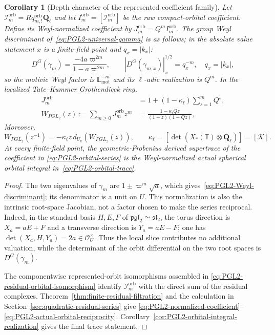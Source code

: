 \documentclass[11pt]{article}
\newtheorem{corollary}[theorem]{Corollary}
\theoremstyle{definition}
\theoremstyle{remark}
\newcommand{\Qell}{\mathbf Q_\ell}
\newcommand{\Lmot}{\mathbb L_{\mathrm{mot}}}
\newcommand{\Uk}{U_k}
\newcommand{\kappaell}{\kappa_{\ell}}
\newcommand{\cK}{\mathcal K}
\begin{document}
\begin{corollary}[Depth character of the represented coefficient family]
\label{thm:PGL2-orbital-reciprocity}
Let
$\mathcal I_m^{\mathrm{orb}}=Rq^{\mathrm{orb}}_{m,!}\Qell$ and let
$I_m^{\mathrm{orb}}=[\mathcal I_m^{\mathrm{orb}}]$ be the raw compact-orbital
coefficient.  Define its Weyl-normalized coefficient by
$J_m^{\mathrm{orb}}=Q^mI_m^{\mathrm{orb}}$.  The group Weyl
discriminant of~\eqref{eq:PGL2-universal-gamma} is as follows; in the absolute
value statement $x$ is a finite-field point and $q_x=|k_x|$:
\begin{equation}
 D^G(\gamma_m)
 =\frac{-4a\varpi^{2m}}{1-a\varpi^{2m}},
 \qquad |D^G(\gamma_{m,x})|_x^{1/2}=q_x^{-m},
 \quad q_x=|k_x|,
 \label{eq:PGL2-Weyl-discriminant}
\end{equation}
so the motivic Weyl factor is $\Lmot^{-m}$ and its $\ell$-adic realization is
$Q^m$.  In the localized
Tate--Kummer Grothendieck ring,
\begin{align}
 J_m^{\mathrm{orb}}
 &=1+(1-\kappaell)\sum_{s=1}^mQ^s,
 \label{eq:PGL2-normalized-coefficient}\\
 W_{PGL_2}(z)
 :=\sum_{m\ge0}J_m^{\mathrm{orb}}z^m
 &=\frac{1-\kappaell Qz}{(1-z)(1-Qz)},
 \label{eq:PGL2-orbital-series}
\end{align}
Moreover,
\begin{equation}
 \boxed{W_{PGL_2}(z^{-1})
 =-\kappaell z\,d_{\Uk}(W_{PGL_2}(z)),\qquad
 \kappaell=[\det(X_*(\mathbb T)\otimes\Qell)]=[\cK].}
 \label{eq:PGL2-actual-orbital-reciprocity}
\end{equation}
At every finite-field point, the geometric-Frobenius derived supertrace of the coefficient in
\eqref{eq:PGL2-orbital-series} is the Weyl-normalized actual spherical orbital
integral in~\eqref{eq:PGL2-orbital-trace}.
\end{corollary}

\begin{proof}
The two eigenvalues of $\gamma_m$ are
$1\pm\varpi^m\sqrt a$, which gives~\eqref{eq:PGL2-Weyl-discriminant}; its
denominator is a unit on $U$.  This normalization is also the intrinsic
root-space Jacobian, not a factor chosen to make the series reciprocal.
Indeed, in the standard basis $H,E,F$ of
$\mathfrak{pgl}_2\simeq\mathfrak{sl}_2$, the torus direction is
$X_a=aE+F$ and a transverse direction is $Y_a=aE-F$; one has
$\det(X_a,H,Y_a)=2a\in\mathcal O_U^\times$.  Thus the local slice contributes
no additional valuation, while the determinant of the orbit differential on
the two root spaces is $D^G(\gamma_m)$.

The componentwise represented-orbit
isomorphisms assembled in
\eqref{eq:PGL2-residual-orbital-isomorphism} identify
$\mathcal I_m^{\mathrm{orb}}$ with the direct sum of the residual complexes.
Theorem~\ref{thm:finite-residual-filtration} and the calculation in
Section~\ref{sec:quadratic-residual-series} give
\eqref{eq:PGL2-normalized-coefficient}--\eqref{eq:PGL2-actual-orbital-reciprocity}.
Corollary~\ref{cor:PGL2-orbital-integral-realization} gives the final trace
statement.
\end{proof}
\end{document}
